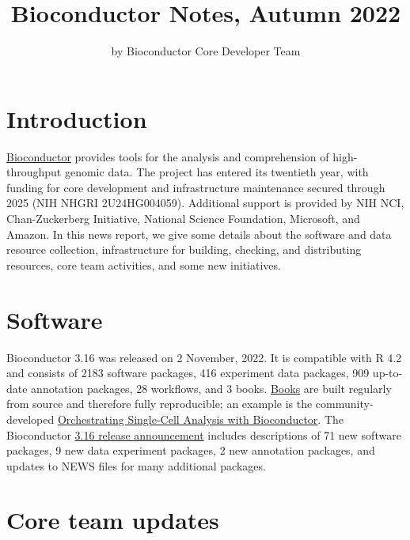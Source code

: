 \title{Bioconductor Notes, Autumn 2022}
\author{by Bioconductor Core Developer Team}

\maketitle


\hypertarget{introduction}{%
\section{Introduction}\label{introduction}}

\href{https://bioconductor.org}{Bioconductor} provides
tools for the analysis and comprehension of high-throughput genomic
data. The project has entered its twentieth year, with funding
for core development and infrastructure maintenance secured
through 2025 (NIH NHGRI 2U24HG004059). Additional support is provided
by NIH NCI, Chan-Zuckerberg Initiative, National Science Foundation,
Microsoft, and Amazon. In this news report, we give some
details about the software and data resource collection,
infrastructure for building, checking, and distributing resources,
core team activities, and some new initiatives.

\hypertarget{software}{%
\section{Software}\label{software}}

Bioconductor 3.16 was released on 2 November, 2022. It is
compatible with R 4.2 and consists of 2183 software packages, 416
experiment data packages, 909 up-to-date annotation packages, 28
workflows, and 3 books. \href{https://bioconductor.org/books/release/}{Books} are
built regularly from source and therefore fully
reproducible; an example is the
community-developed \href{https://bioconductor.org/books/release/OSCA/}{Orchestrating Single-Cell Analysis with Bioconductor}.
The Bioconductor
\href{https://bioconductor.org/news/bioc_3_16_release/}{3.16 release announcement}
includes descriptions of 71 new software packages, 9 new data
experiment packages, 2 new annotation packages, and updates to NEWS files for
many additional packages.

\hypertarget{core-team-updates}{%
\section{Core team updates}\label{core-team-updates}}

